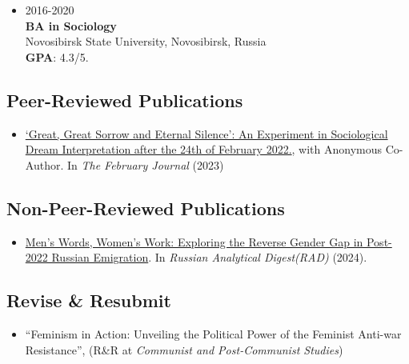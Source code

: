 \documentclass[
]{article}
\providecommand{\tightlist}{%
  \setlength{\itemsep}{0pt}\setlength{\parskip}{0pt}}
\begin{document}
\begin{itemize}
\tightlist
\item
  2016-2020\\
  \textbf{BA in Sociology}\\
  Novosibirsk State University, Novosibirsk, Russia\\
  \textbf{GPA}: 4.3/5.
\end{itemize}

\hypertarget{peer-reviewed-publications}{%
\subsection{Peer-Reviewed
Publications}\label{peer-reviewed-publications}}

\begin{itemize}
\tightlist
\item
  \href{https://thefebruaryjournal.org/index.php/tfj/article/view/67}{`Great,
  Great Sorrow and Eternal Silence': An Experiment in Sociological Dream
  Interpretation after the 24th of February 2022.}, with Anonymous
  Co-Author. In \emph{The February Journal} (2023)
\end{itemize}

\hypertarget{non-peer-reviewed-publications}{%
\subsection{Non-Peer-Reviewed
Publications}\label{non-peer-reviewed-publications}}

\begin{itemize}
\tightlist
\item
  \href{https://www.research-collection.ethz.ch/handle/20.500.11850/692533}{Men's
  Words, Women's Work: Exploring the Reverse Gender Gap in Post-2022
  Russian Emigration}. In \emph{Russian Analytical Digest(RAD)} (2024).
\end{itemize}

\hypertarget{revise-resubmit}{%
\subsection{Revise \& Resubmit}\label{revise-resubmit}}

\begin{itemize}
\tightlist
\item
  ``Feminism in Action: Unveiling the Political Power of the Feminist
  Anti-war Resistance'', (R\&R at \emph{Communist and Post-Communist
  Studies})
\end{itemize}
\end{document}
